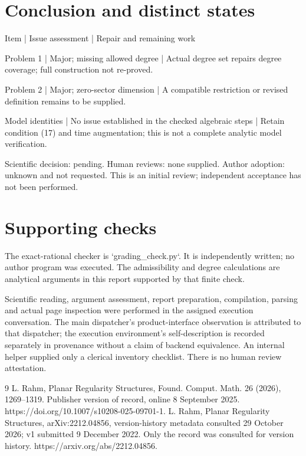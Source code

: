 \documentclass[10pt]{article}
\begin{document}
\section*{Conclusion and distinct states}
Item | Issue assessment | Repair and remaining work\par
Problem 1 | Major; missing allowed degree | Actual degree set repairs degree coverage; full construction not re-proved.\par
Problem 2 | Major; zero-sector dimension | A compatible restriction or revised definition remains to be supplied.\par
Model identities | No issue established in the checked algebraic steps | Retain condition (17) and time augmentation; this is not a complete analytic model verification.\par
Scientific decision: pending. Human reviews: none supplied. Author adoption: unknown and not requested. This is an initial review; independent acceptance has not been performed.\par
\section*{Supporting checks}
The exact-rational checker is `grading\_check.py`. It is independently written; no author program was executed. The admissibility and degree calculations are analytical arguments in this report supported by that finite check.\par
Scientific reading, argument assessment, report preparation, compilation, parsing and actual page inspection were performed in the assigned execution conversation. The main dispatcher’s product-interface observation is attributed to that dispatcher; the execution environment’s self-description is recorded separately in provenance without a claim of backend equivalence. An internal helper supplied only a clerical inventory checklist. There is no human review attestation.\par
9 L. Rahm, Planar Regularity Structures, Found. Comput. Math. 26 (2026), 1269–1319. Publisher version of record, online 8 September 2025. https://doi.org/10.1007/s10208-025-09701-1. L. Rahm, Planar Regularity Structures, arXiv:2212.04856, version-history metadata consulted 29 October 2026; v1 submitted 9 December 2022. Only the record was consulted for version history. https://arxiv.org/abs/2212.04856.\par
\end{document}
